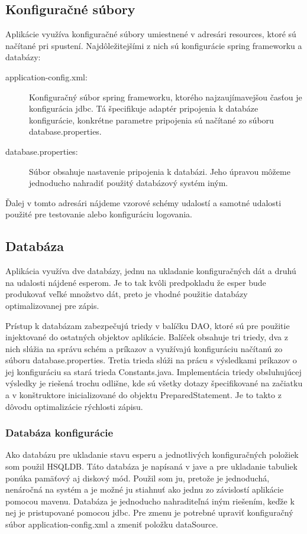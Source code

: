 	\subsection{Konfiguračné súbory}
		Aplikácie využíva konfiguračné súbory umiestnené v adresári resources, ktoré sú načítané pri spustení. Najdôležitejšími z nich sú konfigurácie spring frameworku a databázy:
		\begin{description}
			\item[application-config.xml:] Konfiguračný súbor spring frameworku, ktorého najzaujímavejšou časťou je konfigurácia jdbc. Tá špecifikuje adaptér pripojenia k databáze konfigurácie, konkrétne parametre pripojenia sú načítané zo súboru database.properties.
			\item[database.properties:] Súbor obsahuje nastavenie pripojenia k databázi. Jeho úpravou môžeme jednoducho nahradiť použitý databázový systém iným.
		\end{description}
		Ďalej v tomto adresári nájdeme vzorové schémy udalostí a samotné udalosti použité pre testovanie alebo konfiguráciu logovania.
	
	\subsection{Databáza}
		Aplikácia využíva dve databázy, jednu na ukladanie konfiguračných dát a druhú na udalosti nájdené esperom. Je to tak kvôli predpokladu že esper bude produkovať veľké množstvo dát, preto je vhodné použitie databázy optimalizovanej pre zápis.
		
		Prístup k databázam zabezpečujú triedy v balíčku DAO, ktoré sú pre použitie injektované do ostatných objektov aplikácie. Balíček obsahuje tri triedy, dva z nich slúžia na správu schém a príkazov a využívajú konfiguráciu načítanú zo súboru database.properties. Tretia trieda slúži na prácu s výsledkami príkazov o jej konfiguráciu sa stará trieda Constants.java. Implementácia triedy obsluhujúcej výsledky je riešená trochu odlišne, kde sú všetky dotazy špecifikované na začiatku a v konštruktore inicializované do objektu PreparedStatement. Je to takto z dôvodu optimalizácie rýchlosti zápisu.			
	
		\subsubsection{Databáza konfigurácie}
		Ako databázu pre ukladanie stavu esperu a jednotlivých konfiguračných položiek som použil \ac{HSQLDB}. Táto databáza je napísaná v jave a pre ukladanie tabuliek ponúka pamäťový aj diskový mód. Použil som ju, pretože je jednoduchá, nenáročná na systém a je možné ju stiahnuť ako jednu zo závislostí aplikácie pomocou mavenu. Databáza je jednoducho nahraditeľná iným riešením, keďže k nej je pristupované pomocou jdbc. Pre zmenu je potrebné upraviť konfiguračný súbor application-config.xml a zmeniť položku dataSource.
		
